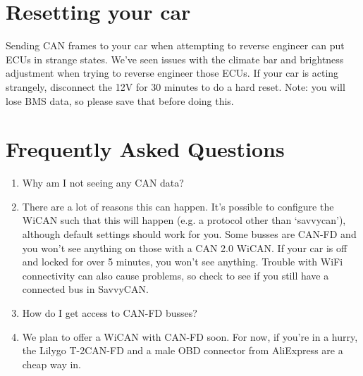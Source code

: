 \documentclass[superscriptaddress,onecolumn,floatfix]{revtex4-2}
\begin{document}
\section{Resetting your car}

Sending CAN frames to your car when attempting to reverse engineer can put ECUs in strange states. We've seen issues with the climate bar and brightness adjustment when trying to reverse engineer those ECUs. If your car is acting strangely, disconnect the 12V for 30 minutes to do a hard reset. Note: you will lose BMS data, so please save that before doing this.

\section{Frequently Asked Questions}
\begin{enumerate}
  \item[Q:] Why am I not seeing any CAN data?
  \item[A:] There are a lot of reasons this can happen. It's possible to configure the WiCAN such that this will happen (e.g. a protocol other than `savvycan'), although default settings should work for you. Some busses are CAN-FD and you won't see anything on those with a CAN 2.0 WiCAN. If your car is off and locked for over 5 minutes, you won't see anything. Trouble with WiFi connectivity can also cause problems, so check to see if you still have a connected bus in SavvyCAN.
  \item[Q:] How do I get access to CAN-FD busses?
  \item[A:] We plan to offer a WiCAN with CAN-FD soon. For now, if you're in a hurry, the Lilygo T-2CAN-FD and a male OBD connector from AliExpress are a cheap way in.
\end{enumerate}
\appendix 
\end{document}
